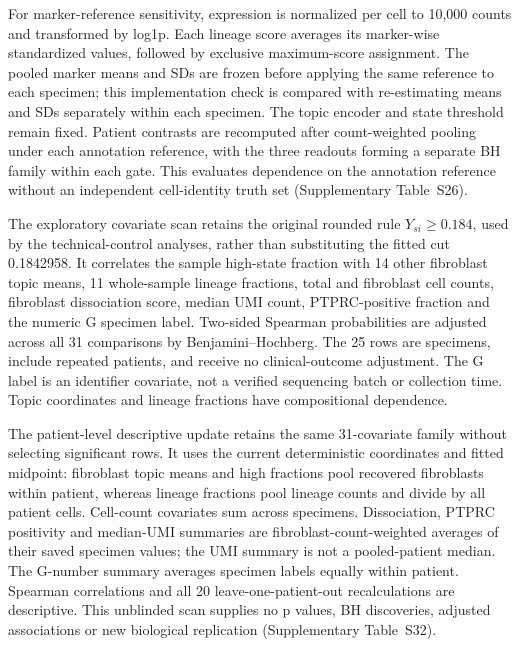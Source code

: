 \documentclass[10pt,a4paper]{article}
\begin{document}
For marker-reference sensitivity, expression is normalized per cell to 10,000 counts and transformed by log1p. Each lineage score averages its marker-wise standardized values, followed by exclusive maximum-score assignment. The pooled marker means and SDs are frozen before applying the same reference to each specimen; this implementation check is compared with re-estimating means and SDs separately within each specimen. The topic encoder and state threshold remain fixed. Patient contrasts are recomputed after count-weighted pooling under each annotation reference, with the three readouts forming a separate BH family within each gate. This evaluates dependence on the annotation reference without an independent cell-identity truth set (Supplementary Table~S26).

The exploratory covariate scan retains the original rounded rule $Y_{si}\geq0.184$, used by the technical-control analyses, rather than substituting the fitted cut 0.1842958. It correlates the sample high-state fraction with 14 other fibroblast topic means, 11 whole-sample lineage fractions, total and fibroblast cell counts, fibroblast dissociation score, median UMI count, PTPRC-positive fraction and the numeric G specimen label. Two-sided Spearman probabilities are adjusted across all 31 comparisons by Benjamini--Hochberg. The 25 rows are specimens, include repeated patients, and receive no clinical-outcome adjustment. The G label is an identifier covariate, not a verified sequencing batch or collection time. Topic coordinates and lineage fractions have compositional dependence.

The patient-level descriptive update retains the same 31-covariate family without selecting significant rows. It uses the current deterministic coordinates and fitted midpoint: fibroblast topic means and high fractions pool recovered fibroblasts within patient, whereas lineage fractions pool lineage counts and divide by all patient cells. Cell-count covariates sum across specimens. Dissociation, PTPRC positivity and median-UMI summaries are fibroblast-count-weighted averages of their saved specimen values; the UMI summary is not a pooled-patient median. The G-number summary averages specimen labels equally within patient. Spearman correlations and all 20 leave-one-patient-out recalculations are descriptive. This unblinded scan supplies no p values, BH discoveries, adjusted associations or new biological replication (Supplementary Table~S32).
\end{document}
